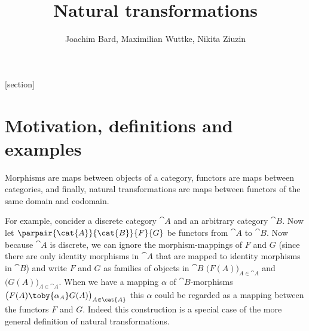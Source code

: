 \def\pathToRoot{../../}
% 

\usepackage{todonotes}

\newcommand{\catA}[0]{\cat{A}}
\newcommand{\catB}[0]{\cat{B}}

[section]
\newtheorem{defn}[counter]{Definition}
\newtheorem{exmp}[counter]{Example}
\newtheorem{lemma}[counter]{Lemma}


\title{Natural transformations}
\author{Joachim Bard, Maximilian Wuttke, Nikita Ziuzin}



\maketitle


\section*{Motivation, definitions and examples}
Morphisms are maps between objects of a category, functors are maps between categories, and finally, natural transformations are maps between functors of the same domain and codomain.

For example, concider a discrete category $\catA$ and an arbitrary category $\catB$.
Now let $\parpair{\catA}{\catB}{F}{G}$ be functors from $\catA$ to $\catB$.
Now because $\catA$ is discrete, we can ignore the morphism-mappings of $F$ and $G$ (since there are only identity morphisms in $\catA$ that are mapped to identity morphisms in $\catB$) and write $F$ and $G$ as families
of objects in $\catB$
$\bigl(F(A)\bigr)_{A\in\catA}$ and $\bigl(G(A)\bigr)_{A\in\catA}$.
When we have a mapping $\alpha$ of $\catB$-morphisms
$\bigl(F(A)\toby{\alpha_A}G(A)\bigr)_{A\in\catA}$
this $\alpha$ could be regarded as a mapping between the functors $F$ and $G$.
Indeed this construction is a special case of the more general definition of natural transformations.

